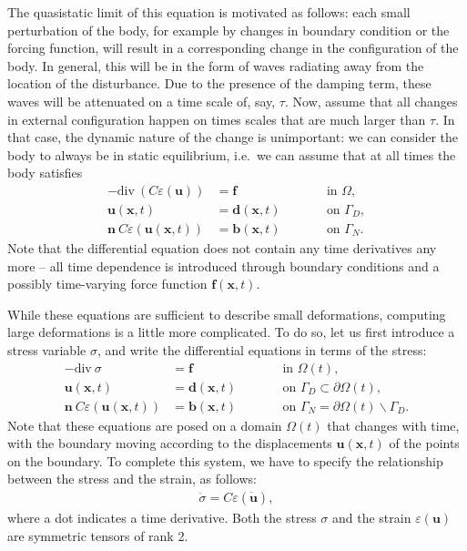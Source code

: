 \documentclass{article}
\renewcommand{\vec}[1]{\mathbf{#1}}
\renewcommand{\div}{\mathrm{div}\ }
\begin{document}
The quasistatic limit of this equation is motivated as follows: each small
perturbation of the body, for example by changes in boundary condition or the
forcing function, will result in a corresponding change in the configuration
of the body. In general, this will be in the form of waves radiating away from
the location of the disturbance. Due to the presence of the damping term,
these waves will be attenuated on a time scale of, say, $\tau$. Now, assume
that all changes in external configuration happen on times scales that are
much larger than $\tau$. In that case, the dynamic nature of the change is
unimportant: we can consider the body to always be in static equilibrium,
i.e.~we can assume that at all times the body satisfies
\begin{align*}
  - \div ( C \varepsilon(\vec u)) &= \vec f
  &&\text{in $\Omega$},
  \\
  \vec u(\vec x,t) &= \vec d(\vec x,t)
  \qquad
  &&\text{on $\Gamma_D$},
  \\
  \vec n \ C \varepsilon(\vec u(\vec x,t)) &= \vec b(\vec x,t)
  \qquad
  &&\text{on $\Gamma_N$}.
\end{align*}
Note that the differential equation does not contain any time derivatives any
more -- all time dependence is introduced through boundary conditions and a
possibly time-varying force function $\vec f(\vec x,t)$.

While these equations are sufficient to describe small deformations, computing
large deformations is a little more complicated. To do so, let us first
introduce a stress variable $\sigma$, and write the differential equations in
terms of the stress:
\begin{align*}
  - \div \sigma &= \vec f
  &&\text{in $\Omega(t)$},
  \\
  \vec u(\vec x,t) &= \vec d(\vec x,t)
  \qquad
  &&\text{on $\Gamma_D\subset\partial\Omega(t)$},
  \\
  \vec n \ C \varepsilon(\vec u(\vec x,t)) &= \vec b(\vec x,t)
  \qquad
  &&\text{on $\Gamma_N=\partial\Omega(t)\backslash\Gamma_D$}.
\end{align*}
Note that these equations are posed on a domain $\Omega(t)$ that
changes with time, with the boundary moving according to the
displacements $\vec u(\vec x,t)$ of the points on the boundary. To
complete this system, we have to specify the relationship between the
stress and the strain, as follows:
\begin{align*}
  \dot\sigma = C \varepsilon (\dot{\vec u}),
\end{align*}
where a dot indicates a time derivative. Both the stress $\sigma$ and the
strain $\varepsilon(\vec u)$ are symmetric tensors of rank 2.
\end{document}
